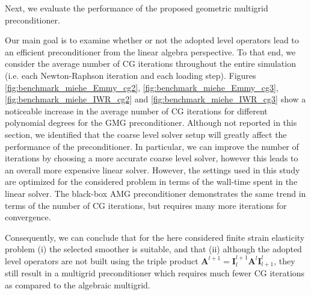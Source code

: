 \documentclass[times,doublespace]{nmeauth}
\def\gz  #1{           \mbox{$\boldsymbol{#1}$}}
\newcommand{\changeDD}[1]{#1}
\newcommand{\changeJP}[1]{#1}
\begin{document}
Next, we evaluate the performance of the proposed geometric multigrid preconditioner.
\changeDD{
Our main goal is to examine whether or not the adopted level operators lead to an efficient preconditioner from the linear algebra perspective. To that end,}
we consider \changeDD{the average number of CG iterations throughout the entire simulation (i.e. each Newton-Raphson iteration and each loading step).}
Figures \ref{fig:benchmark_miehe_Emmy_cg2}, \ref{fig:benchmark_miehe_Emmy_cg3}, \ref{fig:benchmark_miehe_IWR_cg2} and \ref{fig:benchmark_miehe_IWR_cg3} show a
\changeDD{ noticeable} increase in the average number of CG iterations for different polynomial degrees
\changeDD{ for the GMG preconditioner.
Although not reported in this section, we identified that
the coarse level solver setup will greatly affect the performance of the preconditioner.
In particular, we can improve the number of iterations by choosing a more accurate coarse level solver,
however this leads to an overall more expensive linear solver.}
\changeJP{However, the settings used in this study are optimized for the considered problem in terms of the wall-time spent in the linear solver.}
The black-box AMG preconditioner
\changeDD{ demonstrates the same \changeJP{trend in terms of} the number of CG iterations, but}
requires many more iterations for convergence.
\changeJP{
Consequently, we can conclude that for the here considered finite strain elasticity problem (i) the selected smoother is suitable, and that (ii) although the adopted level operators are not built using the triple product $\gz A^{l+1}=\gz I^{l+1}_{l} \gz A^l \gz I^l_{l+1}$, they still result in a multigrid preconditioner which requires much fewer CG iterations as compared to the algebraic multigrid.
}
\end{document}
